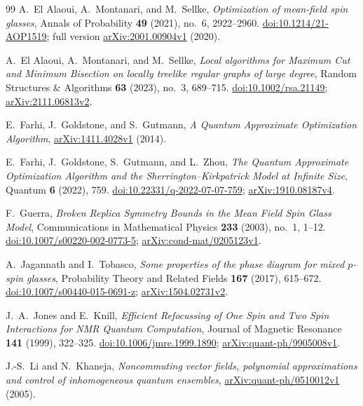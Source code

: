 \begin{thebibliography}{99}
A.~El Alaoui, A.~Montanari, and M.~Sellke,
\emph{Optimization of mean-field spin glasses},
Annals of Probability \textbf{49} (2021), no.~6, 2922--2960.
\href{https://doi.org/10.1214/21-AOP1519}{doi:10.1214/21-AOP1519};
full version \href{https://arxiv.org/abs/2001.00904v1}{arXiv:2001.00904v1} (2020).

A.~El Alaoui, A.~Montanari, and M.~Sellke,
\emph{Local algorithms for Maximum Cut and Minimum Bisection on locally
treelike regular graphs of large degree},
Random Structures \& Algorithms \textbf{63} (2023), no.~3, 689--715.
\href{https://doi.org/10.1002/rsa.21149}{doi:10.1002/rsa.21149};
\href{https://arxiv.org/abs/2111.06813v2}{arXiv:2111.06813v2}.

E.~Farhi, J.~Goldstone, and S.~Gutmann,
\emph{A Quantum Approximate Optimization Algorithm},
\href{https://arxiv.org/abs/1411.4028v1}{arXiv:1411.4028v1} (2014).

E.~Farhi, J.~Goldstone, S.~Gutmann, and L.~Zhou,
\emph{The Quantum Approximate Optimization Algorithm and the
Sherrington--Kirkpatrick Model at Infinite Size},
Quantum \textbf{6} (2022), 759.
\href{https://doi.org/10.22331/q-2022-07-07-759}{doi:10.22331/q-2022-07-07-759};
\href{https://arxiv.org/abs/1910.08187v4}{arXiv:1910.08187v4}.

F.~Guerra,
\emph{Broken Replica Symmetry Bounds in the Mean Field Spin Glass Model},
Communications in Mathematical Physics \textbf{233} (2003), no.~1, 1--12.
\href{https://doi.org/10.1007/s00220-002-0773-5}{doi:10.1007/s00220-002-0773-5};
\href{https://arxiv.org/abs/cond-mat/0205123v1}{arXiv:cond-mat/0205123v1}.

A.~Jagannath and I.~Tobasco,
\emph{Some properties of the phase diagram for mixed $p$-spin glasses},
Probability Theory and Related Fields \textbf{167} (2017), 615--672.
\href{https://doi.org/10.1007/s00440-015-0691-z}{doi:10.1007/s00440-015-0691-z};
\href{https://arxiv.org/abs/1504.02731v2}{arXiv:1504.02731v2}.

J.~A.~Jones and E.~Knill,
\emph{Efficient Refocussing of One Spin and Two Spin Interactions for NMR
Quantum Computation},
Journal of Magnetic Resonance \textbf{141} (1999), 322--325.
\href{https://doi.org/10.1006/jmre.1999.1890}{doi:10.1006/jmre.1999.1890};
\href{https://arxiv.org/abs/quant-ph/9905008v1}{arXiv:quant-ph/9905008v1}.

J.-S.~Li and N.~Khaneja,
\emph{Noncommuting vector fields, polynomial approximations and control of
inhomogeneous quantum ensembles},
\href{https://arxiv.org/abs/quant-ph/0510012v1}{arXiv:quant-ph/0510012v1} (2005).


\end{thebibliography}
